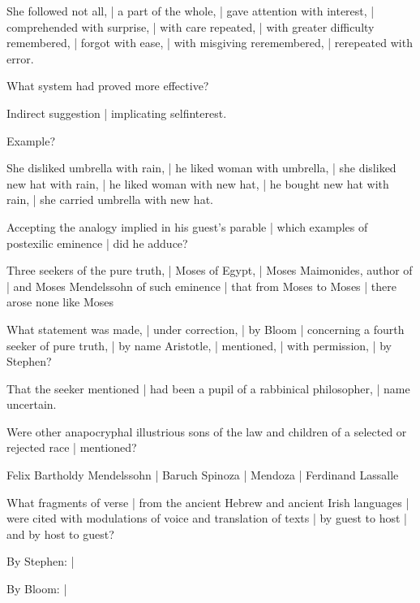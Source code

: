 \Memories
She followed not all, |
a part of the whole, |
gave attention with interest, |
comprehended with surprise, |
with care repeated, |
with greater difficulty remembered, |
forgot with ease, |
with misgiving reremembered, |
rerepeated with error.


What system had proved more effective?

\Philosophy
Indirect suggestion |
implicating self\/interest.


Example?

\Philosophy
She disliked umbrella with rain, |
he liked woman with umbrella, |
she disliked new hat with rain, |
he liked woman with new hat, |
he bought new hat with rain, |
she carried umbrella with new hat.


Accepting the analogy implied in his guest's parable |
which examples of postexilic eminence |
did he adduce?

\Philosophy
Three seekers of the pure truth, |
Moses of Egypt, |
Moses Maimonides, author of 
 |
and Moses Mendelssohn of such eminence |
that from Moses
to Moses
 |
there arose none like Moses


What statement was made, |
under correction, |
by Bloom |
concerning a fourth seeker of pure truth, |
by name Aristotle, |
mentioned, |
with permission, |
by Stephen?

\Philosophy
That the seeker mentioned |
had been a pupil of a rabbinical philosopher, |
name uncertain.


Were other anapocryphal illustrious sons of the law
and children of a selected or rejected race |
mentioned?

\Philosophy
Felix Bartholdy Mendelssohn
 |
Baruch Spinoza
 |
Mendoza
 |
Ferdinand Lassalle


What fragments of verse |
from the ancient Hebrew and ancient Irish languages |
were cited with modulations of voice and translation of texts |
by guest to host |
and by host to guest?

\Stephen
By Stephen:
 |

\Bloom
By Bloom:
 |


